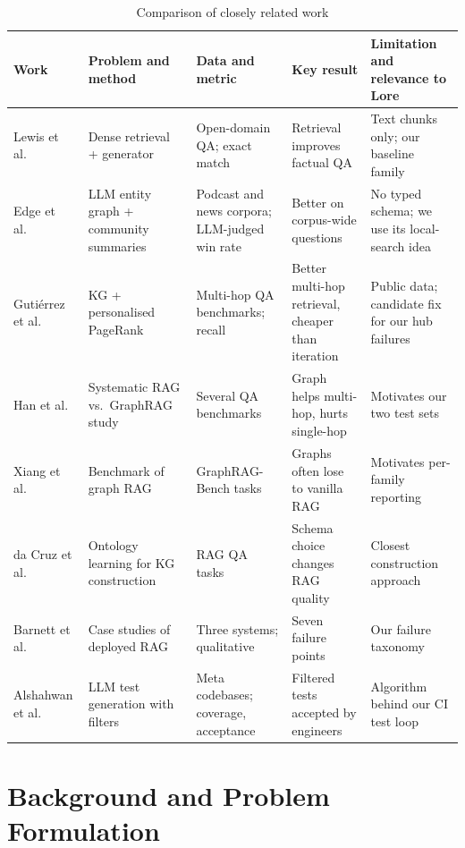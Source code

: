 \documentclass[12pt,onecolumn,draftclsnofoot]{IEEEtran}
\begin{document}
\begin{table}[t]
\centering
\caption{Comparison of closely related work}
\label{tab:related}
\footnotesize
\begin{tabularx}{\textwidth}{@{}p{2.3cm}YYYY@{}}
\toprule
Work & Problem and method & Data and metric & Key result & Limitation and relevance to Lore \\
\midrule
Lewis et al.\ \cite{lewis2020rag} & Dense retrieval + generator & Open-domain QA; exact match & Retrieval improves factual QA & Text chunks only; our baseline family \\
Edge et al.\ \cite{edge2024graphrag} & LLM entity graph + community summaries & Podcast and news corpora; LLM-judged win rate & Better on corpus-wide questions & No typed schema; we use its local-search idea \\
Gutiérrez et al.\ \cite{gutierrez2024hipporag} & KG + personalised PageRank & Multi-hop QA benchmarks; recall & Better multi-hop retrieval, cheaper than iteration & Public data; candidate fix for our hub failures \\
Han et al.\ \cite{han2025ragvsgraphrag} & Systematic RAG vs.\ GraphRAG study & Several QA benchmarks & Graph helps multi-hop, hurts single-hop & Motivates our two test sets \\
Xiang et al.\ \cite{xiang2025graphragbench} & Benchmark of graph RAG & GraphRAG-Bench tasks & Graphs often lose to vanilla RAG & Motivates per-family reporting \\
da Cruz et al.\ \cite{dacruz2025ontology} & Ontology learning for KG construction & RAG QA tasks & Schema choice changes RAG quality & Closest construction approach \\
Barnett et al.\ \cite{barnett2024failure} & Case studies of deployed RAG & Three systems; qualitative & Seven failure points & Our failure taxonomy \\
Alshahwan et al.\ \cite{alshahwan2024testgen} & LLM test generation with filters & Meta codebases; coverage, acceptance & Filtered tests accepted by engineers & Algorithm behind our CI test loop \\
\bottomrule
\end{tabularx}
\end{table}

\section{Background and Problem Formulation}
\end{document}
